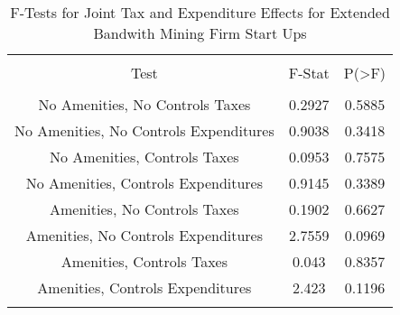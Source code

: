 
\begin{table}[!htbp] \centering 
  \caption{F-Tests for Joint Tax and Expenditure Effects for Extended Bandwith Mining Firm Start Ups} 
  \label{21Ftests} 
\begin{tabular}{@{\extracolsep{5pt}} ccc} 
\\[-1.8ex]\hline 
\hline \\[-1.8ex] 
Test & F-Stat & P(\textgreater F) \\ 
\hline \\[-1.8ex] 
No Amenities, No Controls Taxes & 0.2927 & 0.5885 \\ 
No Amenities, No Controls Expenditures & 0.9038 & 0.3418 \\ 
No Amenities, Controls Taxes & 0.0953 & 0.7575 \\ 
No Amenities, Controls Expenditures & 0.9145 & 0.3389 \\ 
Amenities, No Controls Taxes & 0.1902 & 0.6627 \\ 
Amenities, No Controls Expenditures & 2.7559 & 0.0969 \\ 
Amenities, Controls Taxes & 0.043 & 0.8357 \\ 
Amenities, Controls Expenditures & 2.423 & 0.1196 \\ 
\hline \\[-1.8ex] 
\end{tabular} 
\end{table} 
